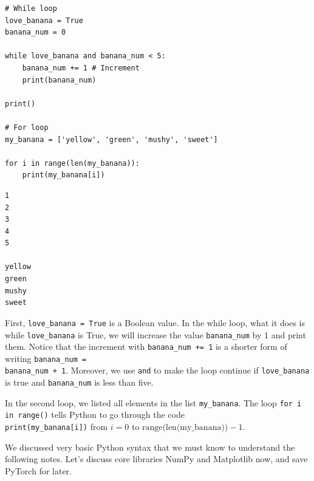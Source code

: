 \documentclass[../../main.tex]{subfiles}
\begin{document}
\begin{jupyter}
\begin{lstlisting}[style=jin]
# While loop
love_banana = True
banana_num = 0

while love_banana and banana_num < 5:
    banana_num += 1 # Increment
    print(banana_num)

print()

# For loop
my_banana = ['yellow', 'green', 'mushy', 'sweet']

for i in range(len(my_banana)):
    print(my_banana[i])
\end{lstlisting}

\begin{lstlisting}[style=jout]
1
2
3
4
5

yellow
green
mushy
sweet
\end{lstlisting}
\end{jupyter}

First, \verb|love_banana = True| is a Boolean value.
In the while loop, what it does is while \verb|love_banana| is True,
we will increase the value \verb|banana_num| by 1 and print them.
Notice that the increment with \verb|banana_num += 1| is a shorter
form of writing \verb|banana_num =| \\ \verb|banana_num + 1|.
Moreover, we use \verb|and| to make the loop continue if
\verb|love_banana| is true and \verb|banana_num| is less than five.

In the second loop, we listed all elements in the list
\verb|my_banana|. The loop \verb|for i in range()| tells Python to
go through the code \\ \verb|print(my_banana[i])| from $i = 0$ to
$\text{range(len(my\_banana))} - 1$.

We discussed very basic Python syntax that we must know to
understand the following notes. Let's discuss core libraries
NumPy and Matplotlib now, and save PyTorch for later.
\end{document}
